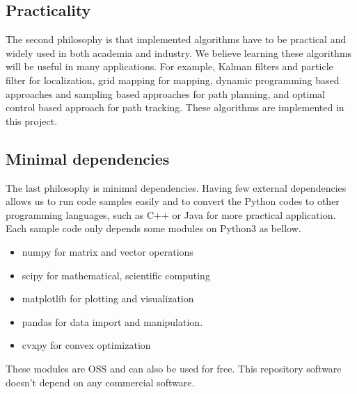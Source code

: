 \documentclass{bmvc2k}
\begin{document}
\subsection{Practicality}
The second philosophy is that implemented algorithms have to be practical and widely used in both academia and industry.
We believe learning these algorithms will be useful in many applications.
For example, Kalman filters and particle filter for localization, grid mapping for mapping, dynamic programming based approaches and sampling based approaches for path planning, and optimal control based approach for path tracking.
These algorithms are implemented in this project.

\subsection{Minimal dependencies}
The last philosophy is minimal dependencies.
Having few external dependencies allows us to run code samples easily and to convert the Python codes to other programming languages, such as C++ or Java for more practical application.
Each sample code only depends some modules on Python3 as bellow.

\begin{itemize}
 \item numpy\cite{numpy} for matrix and vector operations
 \item scipy\cite{scipy} for mathematical, scientific computing
 \item matplotlib\cite{matplotlib} for plotting and visualization
 \item pandas\cite{pandas} for data import and manipulation.
 \item cvxpy\cite{cvxpy} for convex optimization
\end{itemize}

These modules are OSS and can also be used for free.
This repository software doesn't depend on any commercial software.
\end{document}
